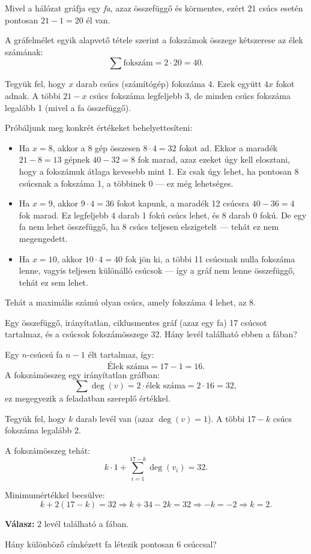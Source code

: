 \begin{solution}
Mivel a hálózat gráfja egy \emph{fa}, azaz összefüggő és körmentes,
ezért 21 csúcs esetén pontosan $21-1=20$ él van.

A gráfelmélet egyik alapvető tétele szerint a fokszámok összege kétszerese
az élek számának: 
\[
\sum\text{fokszám}=2\cdot20=40.
\]

Tegyük fel, hogy $x$ darab csúcs (számítógép) fokszáma 4. Ezek együtt
$4x$ fokot adnak. A többi $21-x$ csúcs fokszáma legfeljebb 3, de
minden csúcs fokszáma legalább 1 (mivel a fa összefüggő).

Próbáljunk meg konkrét értékeket behelyettesíteni:
\begin{itemize}
\item Ha $x=8$, akkor a 8 gép összesen $8\cdot4=32$ fokot ad. Ekkor a
maradék $21-8=13$ gépnek $40-32=8$ fok marad, azaz ezeket úgy kell
elosztani, hogy a fokszámuk átlaga kevesebb mint 1. Ez csak úgy lehet,
ha pontosan 8 csúcsnak a fokszáma 1, a többinek 0 --- ez még lehetséges.
\item Ha $x=9$, akkor $9\cdot4=36$ fokot kapunk, a maradék 12 csúcsra
$40-36=4$ fok marad. Ez legfeljebb 4 darab 1 fokú csúcs lehet, és
8 darab 0 fokú. De egy fa nem lehet összefüggő, ha 8 csúcs teljesen
elszigetelt --- tehát ez nem megengedett.
\item Ha $x=10$, akkor $10\cdot4=40$ fok jön ki, a többi 11 csúcsnak nulla
fokszáma lenne, vagyis teljesen különálló csúcsok --- így a gráf
nem lenne összefüggő, tehát ez sem lehet. 
\end{itemize}
Tehát a maximális számú olyan csúcs, amely fokszáma 4 lehet, az 8.
\end{solution}
\begin{extraproblem}
Egy összefüggő, irányítatlan, ciklusmentes gráf (azaz egy fa) 17
csúcsot tartalmaz, és a csúcsok fokszámösszege 32. Hány levél található
ebben a fában? 
\end{extraproblem}

\begin{solution}
\noindent Egy $n$-csúcsú fa $n-1$ élt tartalmaz, így: 
\[
\text{Élek száma}=17-1=16.
\]
A fokszámösszeg egy irányítatlan gráfban: 
\[
\sum\deg(v)=2\cdot\text{élek száma}=2\cdot16=32,
\]
ez megegyezik a feladatban szereplő értékkel.

Tegyük fel, hogy $k$ darab levél van (azaz $\deg(v)=1$). A többi
$17-k$ csúcs fokszáma legalább 2.

A fokszámösszeg tehát: 
\[
k\cdot1+\sum_{i=1}^{17-k}\deg(v_{i})=32.
\]

Minimumértékkel becsülve: 
\[
k+2(17-k)=32\Rightarrow k+34-2k=32\Rightarrow-k=-2\Rightarrow k=2.
\]

\textbf{Válasz: } $\boxed{2}$ levél található a fában. 
\end{solution}
\begin{extraproblem}
Hány különböző címkézett fa létezik pontosan 6 csúccsal? 
\end{extraproblem}

